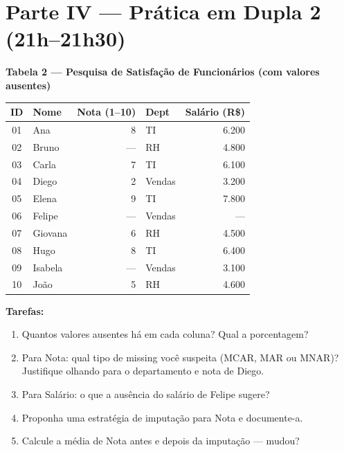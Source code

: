 \section{Parte IV — Prática em Dupla 2 (21h–21h30)}

\begin{BoardBox}
\textbf{Tabela 2 — Pesquisa de Satisfação de Funcionários (com valores ausentes)}

\medskip
\begin{tabular}{|c|l|r|l|r|}
\hline
\textbf{ID} & \textbf{Nome} & \textbf{Nota (1–10)} & \textbf{Dept} & \textbf{Salário (R\$)} \\
\hline
01 & Ana     & 8    & TI      & 6.200 \\
02 & Bruno   & ---  & RH      & 4.800 \\
03 & Carla   & 7    & TI      & 6.100 \\
04 & Diego   & 2    & Vendas  & 3.200 \\
05 & Elena   & 9    & TI      & 7.800 \\
06 & Felipe  & ---  & Vendas  & ---   \\
07 & Giovana & 6    & RH      & 4.500 \\
08 & Hugo    & 8    & TI      & 6.400 \\
09 & Isabela & ---  & Vendas  & 3.100 \\
10 & João    & 5    & RH      & 4.600 \\
\hline
\end{tabular}

\medskip
\textbf{Tarefas:}
\begin{enumerate}
  \item Quantos valores ausentes há em cada coluna? Qual a porcentagem?
  \item Para Nota: qual tipo de missing você suspeita (MCAR, MAR ou MNAR)?
  Justifique olhando para o departamento e nota de Diego.
  \item Para Salário: o que a ausência do salário de Felipe sugere?
  \item Proponha uma estratégia de imputação para Nota e documente-a.
  \item Calcule a média de Nota antes e depois da imputação — mudou?
\end{enumerate}


\end{BoardBox}
